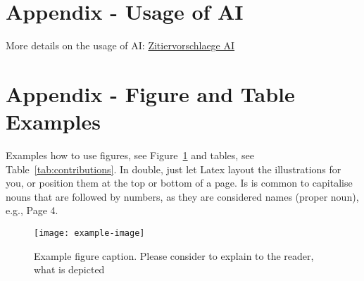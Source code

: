 \documentclass[12pt,a4paper,twocolumn]{article}
\begin{document}
\section{Appendix - Usage of AI}
More details on the usage of AI: \href{https://www.tugraz.at/fileadmin/Studierende\_und\_Bedienstete/Information/Unsere\_TU\_Graz/Lehre\_an\_der\_TU\_Graz/Zitiervorschlaege_KI.pdf}{Zitiervorschlaege AI}

\section{Appendix - Figure and Table Examples}
Examples how to use figures, see Figure~\ref{fig:example} and tables, see Table~\ref{tab:contributions}.
In double, just let Latex layout the illustrations for you, or position them at the top or bottom of a page.
Is is common to capitalise nouns that are followed by numbers, as they are considered names (proper noun), e.g., Page 4.

\begin{figure}
    \centering
        \texttt{[image: example-image]}
    \caption{Example figure caption. Please consider to explain to the reader, what is depicted}
    \label{fig:example}
\end{figure}
\end{document}
